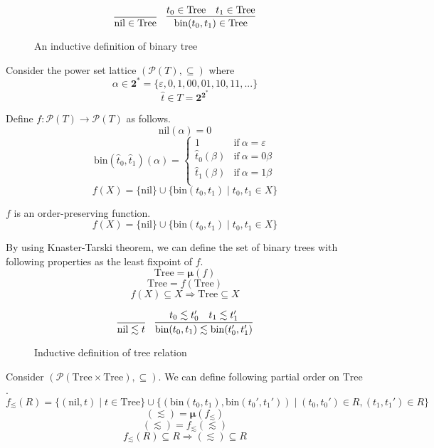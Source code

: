 \documentclass[9pt]{beamer}
\newcommand\pow[1]{\mathcal{P}(#1)}
\newcommand\two[0]{\mathbf{2}}
\newcommand\Tree[0]{\text{Tree}}
\newcommand\nil[0]{\text{nil}}
\newcommand\bin[0]{\text{bin}}
\newcommand\fix[0]{\boldsymbol{\mu}}
\begin{document}
\begin{frame}
  \begin{figure}
  \[
    \infer
    {\nil \in \Tree}
    { }
    \quad
    \infer
    {\bin(t_0,t_1) \in \Tree}
    {t_0 \in \Tree & t_1 \in \Tree}
  \]
  \caption{An inductive definition of binary tree}
  \end{figure}

  \pause
  Consider the power set lattice $(\pow{T}, \subseteq)$ where
  $$\alpha \in \two^* = \{\varepsilon, 0, 1, 00, 01, 10, 11, ...\}$$
  $$\hat t \in T = \two^{\two^*}$$

  Define $f : \pow{T} \to \pow{T}$ as follows.
  $$ \nil(\alpha) = 0 $$
  $$\bin(\hat t_0, \hat t_1)(\alpha) = \begin{cases}
    1               & \text{if} \ \alpha = \varepsilon \\
    \hat t_0(\beta) & \text{if} \ \alpha = 0\beta \\
    \hat t_1(\beta) & \text{if} \ \alpha = 1\beta \\
    \end{cases}
  $$
  $$ f(X) = \{\nil\} \cup \{\bin(t_0,t_1) \mid t_0, t_1 \in X\} $$
\end{frame}

\begin{frame}
  $f$ is an order-preserving function.
  $$ f(X) = \{\nil\} \cup \{\bin(t_0,t_1) \mid t_0, t_1 \in X\} $$

  By using Knaster-Tarski theorem, we can define the set of binary trees with following properties
  as the least fixpoint of $f$.
  $$ \Tree = \fix(f) $$
  $$ \Tree = f(\Tree) $$
  $$ f(X) \subseteq X \Rightarrow \Tree \subseteq X $$

\end{frame}

\begin{frame}
  \begin{figure}
  \[
    \infer
    {\nil \lesssim t}
    {}
    \quad
    \infer
    {\bin(t_0,t_1) \lesssim \bin(t_0',t_1')}
    {t_0 \lesssim t_0' & t_1 \lesssim t_1'}
  \]
  \caption{Inductive definition of tree relation}
  \end{figure}

  Consider $(\pow{\Tree \times \Tree}, \subseteq)$.
  We can define following partial order on $\Tree$.
  $$ f_\lesssim(R) =
    \{(\nil,t) \mid t \in \Tree\} \cup
    \{(\bin(t_0, t_1), \bin(t_0', t_1')) \mid (t_0, t_0') \in R, (t_1, t_1') \in R \}
  $$
  $$ (\lesssim) = \fix(f_\lesssim) $$
  $$ (\lesssim) = f_\lesssim(\lesssim) $$
  $$ f_\lesssim(R) \subseteq R \Rightarrow (\lesssim) \subseteq R $$
\end{frame}
\end{document}
